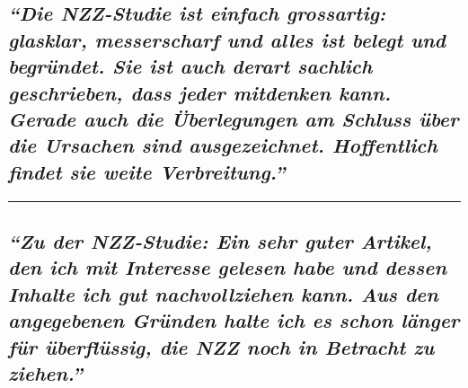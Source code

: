 \hypertarget{die-nzz-studie-ist-einfach-grossartig-glasklar-messerscharf-und-alles-ist-belegt-und-begruxfcndet-sie-ist-auch-derart-sachlich-geschrieben-dass-jeder-mitdenken-kann-gerade-auch-die-uxfcberlegungen-am-schluss-uxfcber-die-ursachen-sind-ausgezeichnet-hoffentlich-findet-sie-weite-verbreitung}{%
\subsection{\texorpdfstring{\emph{``Die NZZ-Studie ist einfach
gross­artig: glasklar, messer­scharf und alles ist belegt und begründet.
Sie ist auch derart sachlich geschrieben, dass jeder mitdenken kann.
Gerade auch die Über­le­gungen am Schluss über die Ursachen sind
ausge­zeichnet. Hoffentlich findet sie weite
Verbreitung.''}}{``Die NZZ-Studie ist einfach gross­artig: glasklar, messer­scharf und alles ist belegt und begründet. Sie ist auch derart sachlich geschrieben, dass jeder mitdenken kann. Gerade auch die Über­le­gungen am Schluss über die Ursachen sind ausge­zeichnet. Hoffentlich findet sie weite Verbreitung.''}}\label{die-nzz-studie-ist-einfach-grossartig-glasklar-messerscharf-und-alles-ist-belegt-und-begruxfcndet-sie-ist-auch-derart-sachlich-geschrieben-dass-jeder-mitdenken-kann-gerade-auch-die-uxfcberlegungen-am-schluss-uxfcber-die-ursachen-sind-ausgezeichnet-hoffentlich-findet-sie-weite-verbreitung}}

\begin{center}\rule{0.5\linewidth}{\linethickness}\end{center}

\hypertarget{zu-der-nzz-studie-ein-sehr-guter-artikel-den-ich-mit-interesse-gelesen-habe-und-dessen-inhalte-ich-gut-nachvollziehen-kann-aus-den-angegebenen-gruxfcnden-halte-ich-es-schon-luxe4nger-fuxfcr-uxfcberfluxfcssig-die-nzz-noch-in-betracht-zu-ziehen}{%
\subsection{\texorpdfstring{\emph{``Zu der NZZ-Studie: Ein sehr guter
Artikel, den ich mit Interesse gelesen habe und dessen Inhalte ich gut
nachvollziehen kann. Aus den angegebenen Gründen halte ich es schon
länger für überflüssig, die NZZ noch in Betracht zu
ziehen.''}}{``Zu der NZZ-Studie: Ein sehr guter Artikel, den ich mit Interesse gelesen habe und dessen Inhalte ich gut nachvollziehen kann. Aus den angegebenen Gründen halte ich es schon länger für überflüssig, die NZZ noch in Betracht zu ziehen.''}}\label{zu-der-nzz-studie-ein-sehr-guter-artikel-den-ich-mit-interesse-gelesen-habe-und-dessen-inhalte-ich-gut-nachvollziehen-kann-aus-den-angegebenen-gruxfcnden-halte-ich-es-schon-luxe4nger-fuxfcr-uxfcberfluxfcssig-die-nzz-noch-in-betracht-zu-ziehen}}

